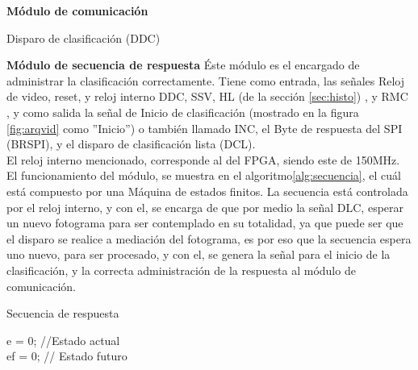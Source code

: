 \documentclass[twoside,spanish,ESP,MSc]{plantillaLabUPV}
\theoremstyle{definition}
\begin{document}
\checkmark\textbf{Módulo de comunicación}

Disparo de clasificación (DDC)

\checkmark\textbf{Módulo de secuencia de respuesta}
Éste módulo es el encargado de administrar la clasificación correctamente. Tiene como entrada, las señales Reloj de video, reset, y reloj interno DDC, SSV, HL (de la sección \ref{sec:histo}) , y RMC , y como salida la señal de Inicio de clasificación (mostrado en la figura \ref{fig:arqvid} como ''Inicio'') o también llamado INC, el Byte de respuesta del SPI (BRSPI), y el disparo de clasificación lista (DCL).\\

El reloj interno mencionado, corresponde al del FPGA, siendo este de 150MHz. El funcionamiento del módulo, se muestra en el algoritmo\ref{alg:secuencia}, el cuál está compuesto por una Máquina de estados finitos. La secuencia está controlada por el reloj interno, y con el, se encarga de que por medio la señal DLC, esperar un nuevo fotograma para ser contemplado en su totalidad, ya que puede ser que el disparo se realice a mediación del fotograma, es por eso que la secuencia espera uno nuevo, para ser procesado, y con el, se genera la señal para el inicio de la clasificación, y la correcta administración de la respuesta al módulo de comunicación.  

\begin{algorithm} %
	\caption{Secuencia de respuesta}
	\label{alg:secuencia}
	\SetAlgoLined
	
	e = 0; //Estado actual \\
	ef = 0; // Estado futuro \\
	
\end{algorithm}
\end{document}
